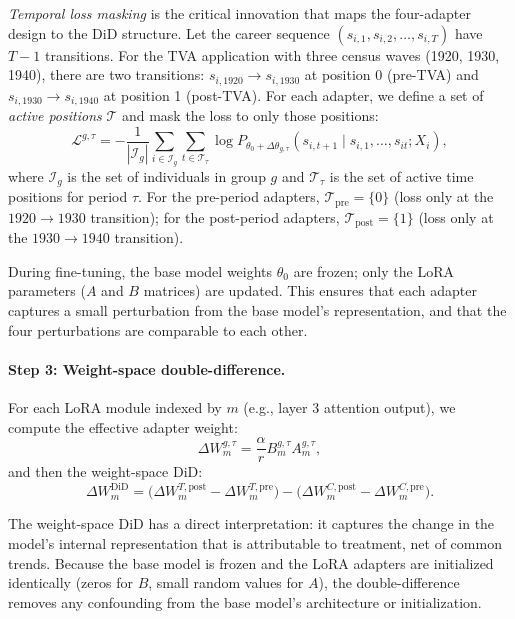 \documentclass[12pt]{article}
\begin{document}
\textit{Temporal loss masking} is the critical innovation that maps the four-adapter design to the DiD structure. Let the career sequence $(s_{i,1}, s_{i,2}, \ldots, s_{i,T})$ have $T-1$ transitions. For the TVA application with three census waves (1920, 1930, 1940), there are two transitions: $s_{i,1920} \to s_{i,1930}$ at position 0 (pre-TVA) and $s_{i,1930} \to s_{i,1940}$ at position 1 (post-TVA). For each adapter, we define a set of \textit{active positions} $\mathcal{T}$ and mask the loss to only those positions:
\begin{equation}\label{eq:masked_loss}
\mathcal{L}^{g,\tau} = -\frac{1}{|\mathcal{I}_g|} \sum_{i \in \mathcal{I}_g} \sum_{t \in \mathcal{T}_\tau} \log P_{\theta_0 + \Delta\theta_{g,\tau}}(s_{i,t+1} \mid s_{i,1}, \ldots, s_{it}; X_i),
\end{equation}
where $\mathcal{I}_g$ is the set of individuals in group $g$ and $\mathcal{T}_\tau$ is the set of active time positions for period $\tau$. For the pre-period adapters, $\mathcal{T}_{\text{pre}} = \{0\}$ (loss only at the $1920 \to 1930$ transition); for the post-period adapters, $\mathcal{T}_{\text{post}} = \{1\}$ (loss only at the $1930 \to 1940$ transition).

During fine-tuning, the base model weights $\theta_0$ are frozen; only the LoRA parameters ($A$ and $B$ matrices) are updated. This ensures that each adapter captures a small perturbation from the base model's representation, and that the four perturbations are comparable to each other.

\paragraph{Step 3: Weight-space double-difference.} For each LoRA module indexed by $m$ (e.g., layer 3 attention output), we compute the effective adapter weight:
\begin{equation}
\Delta W_m^{g,\tau} = \frac{\alpha}{r} B_m^{g,\tau} A_m^{g,\tau},
\end{equation}
and then the weight-space DiD:
\begin{equation}\label{eq:did_lora}
\Delta W_m^{\text{DiD}} = \bigl(\Delta W_m^{T,\text{post}} - \Delta W_m^{T,\text{pre}}\bigr) - \bigl(\Delta W_m^{C,\text{post}} - \Delta W_m^{C,\text{pre}}\bigr).
\end{equation}

The weight-space DiD has a direct interpretation: it captures the change in the model's internal representation that is attributable to treatment, net of common trends. Because the base model is frozen and the LoRA adapters are initialized identically (zeros for $B$, small random values for $A$), the double-difference removes any confounding from the base model's architecture or initialization.
\end{document}
